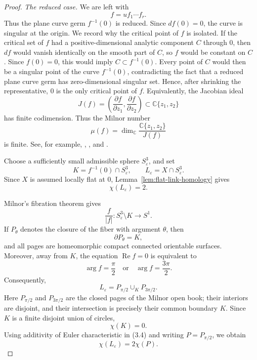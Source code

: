 \documentclass[11pt]{amsart}
\theoremstyle{definition}
\theoremstyle{remark}
\begin{document}
\begin{proof}
\smallskip
\noindent\emph{The reduced case.}
We are left with
\[
        f=u f_1\cdots f_r.
\]
Thus the plane curve germ \(f^{-1}(0)\) is reduced. Since
\(df(0)=0\), the curve is singular at the origin. We record why the
critical point of \(f\) is isolated. If the critical set of \(f\) had a
positive-dimensional analytic component \(C\) through \(0\), then
\(df\) would vanish identically on the smooth part of \(C\), so \(f\)
would be constant on \(C\). Since \(f(0)=0\), this would imply
\(C\subset f^{-1}(0)\). Every point of \(C\) would then be a singular
point of the curve \(f^{-1}(0)\), contradicting the fact that a reduced
plane curve germ has zero-dimensional singular set. Hence, after
shrinking the representative, \(0\) is the only critical point of
\(f\). Equivalently, the Jacobian ideal
\[
        J(f)=\left(
        \frac{\partial f}{\partial z_1},
        \frac{\partial f}{\partial z_2}
        \right)
        \subset \mathbb C\{z_1,z_2\}
\]
has finite codimension. Thus the Milnor number
\[
        \mu(f)=
        \dim_{\mathbb C}
        \frac{\mathbb C\{z_1,z_2\}}{J(f)}
\]
is finite. See, for example, \cite[Secs.~4--7]{Milnor1968},
\cite[Ch.~3]{Dimca1992}, and \cite[Ch.~5]{Wall2004}.

Choose a sufficiently small admissible sphere
\(S^3_\varepsilon\), and set
\[
        K=f^{-1}(0)\cap S^3_\varepsilon,
        \qquad
        L_\varepsilon=X\cap S^3_\varepsilon.
\]
Since \(X\) is assumed locally flat at \(0\),
Lemma~\ref{lem:flat-link-homology} gives
\[
        \chi(L_\varepsilon)=2.
        \tag{3.3}
\]

Milnor's fibration theorem gives
\[
        \frac{f}{|f|}:S^3_\varepsilon\setminus K\longrightarrow S^1.
\]
If \(P_\theta\) denotes the closure of the fiber with argument
\(\theta\), then
\[
        \partial P_\theta=K,
\]
and all pages are homeomorphic compact connected orientable
surfaces. Moreover, away from \(K\), the equation
\(\operatorname{Re}f=0\) is equivalent to
\[
        \arg f=\frac{\pi}{2}
        \quad\text{or}\quad
        \arg f=\frac{3\pi}{2}.
\]
Consequently,
\[
        L_\varepsilon
        =
        P_{\pi/2}\cup_K P_{3\pi/2}.
        \tag{3.4}
\]
Here \(P_{\pi/2}\) and \(P_{3\pi/2}\) are the closed pages of the
Milnor open book; their interiors are disjoint, and their intersection
is precisely their common boundary \(K\). Since \(K\) is a finite
disjoint union of circles,
\[
        \chi(K)=0.
\]
Using additivity of Euler characteristic in (3.4) and writing
\(P=P_{\pi/2}\), we obtain
\[
        \chi(L_\varepsilon)=2\chi(P).
        \tag{3.5}
\]


\end{proof}
\end{document}

